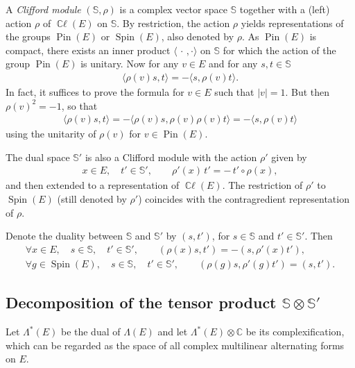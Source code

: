 \documentclass[10pt,a4paper]{amsart}
\DeclareMathOperator{\ccl}{\mathbb{C}\ell} %
\DeclareMathOperator{\Spin}{Spin}
\DeclareMathOperator{\Pin}{Pin}
\numberwithin{equation}{section}
\begin{document}
A \emph{Clifford module} $(\mathbb S, \rho)$ is a complex vector space $\mathbb S$ together with a (left) action $\rho$ of $\ccl(E)$ on $\mathbb S$. By restriction, the action $\rho$ yields representations of the groups $\Pin(E)$ or $\Spin(E)$, also denoted by $\rho$. As $\Pin(E)$ is compact, there exists an inner product $\langle\,\cdot \,,\cdot\rangle$ on $\mathbb S$ for which the action of the group $\Pin(E)$ is unitary. Now for any $v\in E$ and for any $s,t\in \mathbb S$
\begin{gather*}\label{rho(v)}
\langle \rho(v)s, t\rangle= - \langle s, \rho(v)t\rangle .
\end{gather*}
In fact, it suffices to prove the formula for $v\in E$ such that $\vert v\vert =1$. But then $\rho(v)^2 = -1$, so that
\begin{gather*}
\langle \rho(v)s, t\rangle=-\langle \rho(v)s, \rho(v) \rho(v) t\rangle= - \langle s, \rho(v)t\rangle
\end{gather*}
using the unitarity of $\rho(v)$ for $v\in \Pin(E)$.


The dual space $\mathbb S'$ is also a Clifford module with the action $\rho'$ given by
\begin{gather*}
x\in E,\quad t'\in \mathbb S',\qquad \rho'(x)\, t'= -\,t'\circ \rho(x),
\end{gather*}
and then extended to a representation of $\ccl(E)$. The restriction of $\rho'$ to $\Spin(E)$ (still denoted by $\rho'$) coincides with the contragredient representation of $\rho$.

 Denote the duality between $\mathbb S$ and $\mathbb S'$ by $(s, t')$, for $s\in \mathbb S$ and $t'\in \mathbb S'$. Then
\begin{gather}
\forall x\in E,\quad s\in \mathbb S,\quad t'\in\mathbb S', \qquad (\rho(x) s,t') = -(s,\rho'(x)t'),\nonumber
\\[.5ex]
\forall g\in \Spin(E),\quad s\in \mathbb S,\quad t'\in\mathbb S',\qquad (\rho(g) s,\rho'(g)t') = (s,t').\label{1rhorho'1}
\end{gather}

\subsection[Decomposition of the tensor product SxS']
{Decomposition of the tensor product $\boldsymbol{\mathbb S\otimes \mathbb S'}$}

 Let $\Lambda^*(E)$ be the dual of $\Lambda(E)$ and let $\Lambda^*(E)\otimes \mathbb C$ be its complexification, which can be regarded as the space of all complex multilinear alternating forms on $E$.
\end{document}
